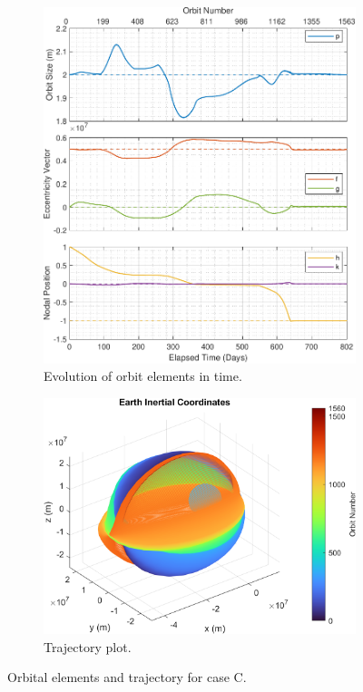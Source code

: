 \begin{figure}[H]
    \centering
    \begin{subfigure}[t]{0.4\textwidth}
        \includegraphics[width=\textwidth]{figures/plane_change/orbital_elements.pdf}
        \caption{Evolution of orbit elements in time.}
        \label{fig:results_c_a}
    \end{subfigure}
    \begin{subfigure}[t]{0.59\textwidth}
        \includegraphics[width=\textwidth]{figures/plane_change/trajectory_plot.png}
        \caption{Trajectory plot.}
        \label{fig:results_c_b}
    \end{subfigure}
    \caption{Orbital elements and trajectory for case C.}
    \label{fig:results_c}
\end{figure}

